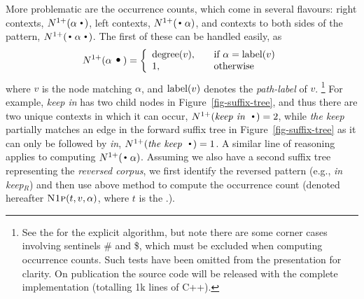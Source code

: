 More problematic are the occurrence counts, which come in several
flavours: right contexts, $\nlplus{\patdot}$,
left contexts,  $\nlplus{\dotpat}$, and contexts to both sides of the pattern,
$\nlplus{\dotpatdot}$. 
The first of these can be handled easily, as 
\begin{equation*}
\nlplus{\patdot} = \left\{ 
\begin{array}{ll}
   \degree{t}{v}, \quad & \text{if~} \alpha = \pathlabel{t}{v} \\
   1, & \text{otherwise}
\end{array} \right.
\end{equation*}
where $v$ is the node matching $\alpha$, and 
$\pathlabel{t}{v}$ denotes the  {\it path-label} of $v$.%
\footnote{See the \supp for the explicit algorithm, but note there are some corner cases involving sentinels \#
  and \$, which must be excluded when computing occurrence counts.
  Such tests have been omitted from the presentation for clarity. On publication the
  source code will be released with the complete implementation (totalling 1k lines of C++).}
For example, \emph{keep in} has two child nodes in  Figure~\ref{fig-suffix-tree},
and thus there are two unique contexts in which it can occur, $\nlplus{\emph{keep in~}\Bigcdot}=2$,
while \emph{the keep} partially matches an edge in the forward suffix tree in
Figure~\ref{fig-suffix-tree} as it can only be followed by \emph{in}, $\nlplus{\emph{the keep~}\Bigcdot}=1$.
A similar line of reasoning applies to computing $\nlplus{\dotpat}$. 
Assuming we also have a second suffix tree representing the \emph{reversed corpus}, we first identify the reversed pattern (e.g., \emph{in keep}$_R$) and then use above method to compute the occurrence count (denoted hereafter $\nlplusfunc{t}{v}{\alpha}$, where $t$ is the \CST.). 

